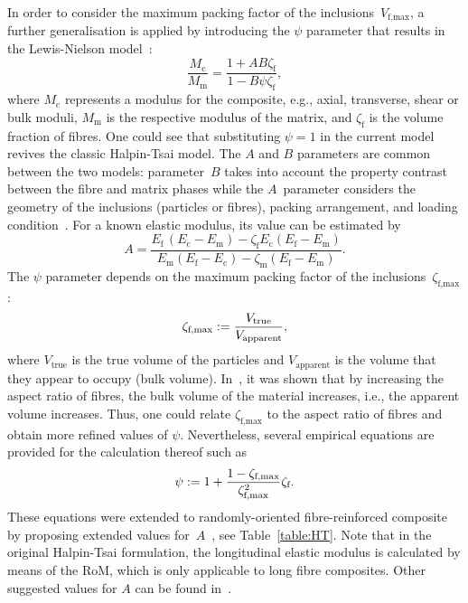     In order to consider the maximum packing factor of the inclusions~$V_\text{f,max}$, a further generalisation is applied by introducing the $\psi$ parameter that results in the Lewis-Nielson model~\autocite{Nielsen.1970}:
    \begin{equation}
        \frac{M_\text{c}}{M_\text{m}}=\frac{1+AB\zeta_\text{f}}{1-B\psi \zeta_\text{f}},
    \end{equation}
	where $M_\text{c}$ represents a modulus for the composite, e.g., axial, transverse, shear or bulk moduli, $M_\text{m}$ is the respective modulus of the matrix, and $\zeta_\text{f}$ is the volume fraction of fibres. One could see that substituting $\psi=1$ in the current model revives the classic Halpin-Tsai model. The $A$ and $B$ parameters are common between the two models: parameter~$B$ takes into account the property contrast between the fibre and matrix phases while the $A$~parameter considers the geometry of the inclusions (particles or fibres), packing arrangement, and loading condition~\autocite{Nielsen.1994}. For a known elastic modulus, its value can be estimated by
	\begin{equation}
		A=\frac{E_\text{f}\,(E_\text{c}-E_\text{m})-\zeta_\text{f}E_\text{c}(E_\text{f}-E_\text{m})}
		   	   {E_\text{m}(E_\text{f}-E_\text{c})-\zeta_\text{m}(E_\text{f}-E_\text{m})}.
	\end{equation}
    The $\psi$ parameter depends on the maximum packing factor of the inclusions~$\zeta_\text{f,max}$:
    \begin{equation}
	\zeta_\text{f,max}\mathrel{:=}\frac{V_\text{true}}{V_\text{apparent}},
    \end{equation}
    where $V_\text{true}$ is the true volume of the particles and $V_\text{apparent}$ is the volume that they appear to occupy (bulk volume). In~\autocite{Milewski.1978}, it was shown that by increasing the aspect ratio of fibres, the bulk volume of the material increases, i.e., the apparent volume increases. Thus, one could relate $\zeta_\text{f,max}$ to the aspect ratio of fibres and obtain more refined values of $\psi$. Nevertheless, several empirical equations are provided for the calculation thereof such as
    \begin{equation}
    	\psi\mathrel{:=} 1+ \frac{1-\zeta_\text{f,max}}{\zeta_\text{f,max}^2}\zeta_\text{f}.
    \end{equation}
    These equations were extended to randomly-oriented fibre-reinforced composite by proposing extended values for~$A$~\autocite{Nielsen.1994, Lewis.1970, Nielsen.1970}, see Table~\ref{table:HT}. Note that in the original Halpin-Tsai formulation, the longitudinal elastic modulus is calculated by means of the RoM, which is only applicable to long fibre composites. Other suggested values for $A$ can be found in~\autocite{Halpin.1992}. 

